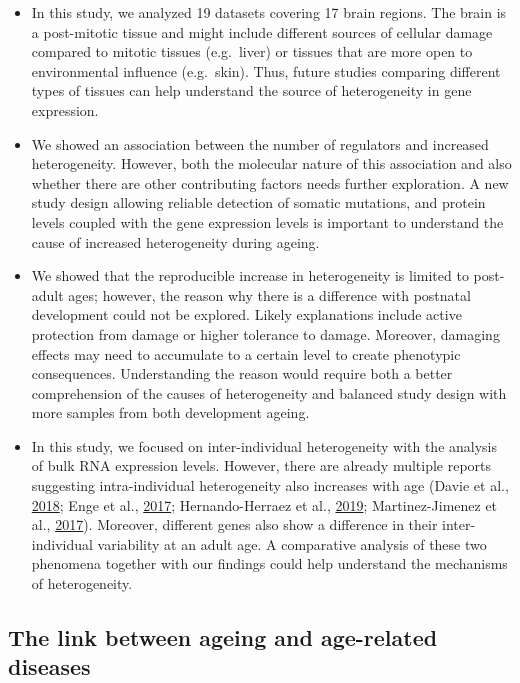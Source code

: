\documentclass[12pt,twoside]{unicam}
\providecommand{\tightlist}{%
  \setlength{\itemsep}{0pt}\setlength{\parskip}{0pt}}
\begin{document}
\begin{itemize}
\tightlist
\item
  In this study, we analyzed 19 datasets covering 17 brain regions. The brain is a post-mitotic tissue and might include different sources of cellular damage compared to mitotic tissues (e.g.~liver) or tissues that are more open to environmental influence (e.g.~skin). Thus, future studies comparing different types of tissues can help understand the source of heterogeneity in gene expression.
\item
  We showed an association between the number of regulators and increased heterogeneity. However, both the molecular nature of this association and also whether there are other contributing factors needs further exploration. A new study design allowing reliable detection of somatic mutations, and protein levels coupled with the gene expression levels is important to understand the cause of increased heterogeneity during ageing.
\item
  We showed that the reproducible increase in heterogeneity is limited to post-adult ages; however, the reason why there is a difference with postnatal development could not be explored. Likely explanations include active protection from damage or higher tolerance to damage. Moreover, damaging effects may need to accumulate to a certain level to create phenotypic consequences. Understanding the reason would require both a better comprehension of the causes of heterogeneity and balanced study design with more samples from both development ageing.
\item
  In this study, we focused on inter-individual heterogeneity with the analysis of bulk RNA expression levels. However, there are already multiple reports suggesting intra-individual heterogeneity also increases with age (Davie et al., \protect\hyperlink{ref-Davie2018}{2018}; Enge et al., \protect\hyperlink{ref-Enge2017}{2017}; Hernando-Herraez et al., \protect\hyperlink{ref-Hernando-Herraez2019}{2019}; Martinez-Jimenez et al., \protect\hyperlink{ref-Martinez-Jimenez2017}{2017}). Moreover, different genes also show a difference in their inter-individual variability at an adult age. A comparative analysis of these two phenomena together with our findings could help understand the mechanisms of heterogeneity.
\end{itemize}

\hypertarget{the-link-between-ageing-and-age-related-diseases}{%
\subsection{The link between ageing and age-related diseases}\label{the-link-between-ageing-and-age-related-diseases}}
\end{document}
